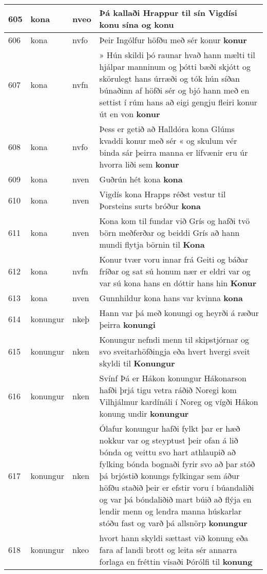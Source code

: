 \documentclass{article}
\begin{document}
\begin{longtable}{p{1cm}|p{1cm}|p{1cm}|p{13cm}}
\hline
605&kona&nveo&Þá kallaði Hrappur til sín Vigdísi konu sína og \textbf{konu} \\
\hline
606&kona&nvfo&Þeir Ingólfur höfðu með sér konur \textbf{konur} \\
\hline
607&kona&nvfn&» Hún skildi þó raunar hvað hann mælti til hjálpar manninum og þótti bæði skjótt og skörulegt hans úrræði og tók hún síðan búnaðinn af höfði sér og bjó hann með en settist í rúm hans að eigi gengju fleiri konur út en von \textbf{konur} \\
\hline
608&kona&nvfo&Þess er getið að Halldóra kona Glúms kvaddi konur með sér « og skulum vér binda sár þeirra manna er lífvænir eru úr hvorra liði sem \textbf{konur} \\
\hline
609&kona&nven&Guðrún hét kona \textbf{kona} \\
\hline
610&kona&nven&Vigdís kona Hrapps réðst vestur til Þorsteins surts bróður \textbf{kona} \\
\hline
611&kona&nven&Kona kom til fundar við Grís og hafði tvö börn meðferðar og beiddi Grís að hann mundi flytja börnin til \textbf{Kona} \\
\hline
612&kona&nvfn&Konur tvær voru innar frá Geiti og báðar fríðar og sat sú honum nær er eldri var og var sú kona hans en dóttir hans hin \textbf{Konur} \\
\hline
613&kona&nven&Gunnhildur kona hans var kvinna \textbf{kona} \\
\hline
614&konungur&nkeþ&Hann var þá með konungi og heyrði á ræður þeirra \textbf{konungi} \\
\hline
615&konungur&nken&Konungur nefndi menn til skipstjórnar og svo sveitarhöfðingja eða hvert hvergi sveit skyldi til \textbf{Konungur} \\
\hline
616&konungur&nken&Svínf Þá er Hákon konungur Hákonarson hafði þrjá tigu vetra ráðið Noregi kom Vilhjálmur kardínáli í Noreg og vígði Hákon konung undir \textbf{konungur} \\
\hline
617&konungur&nken&Ólafur konungur hafði fylkt þar er hæð nokkur var og steyptust þeir ofan á lið bónda og veittu svo hart athlaupið að fylking bónda bognaði fyrir svo að þar stóð þá brjóstið konungs fylkingar sem áður höfðu staðið þeir er efstir voru í búandaliði og var þá bóndaliðið mart búið að flýja en lendir menn og lendra manna húskarlar stóðu fast og varð þá allsnörp \textbf{konungur} \\
\hline
618&konungur&nkeo&hvort hann skyldi sættast við konung eða fara af landi brott og leita sér annarra forlaga en fréttin vísaði Þórólfi til \textbf{konung} \\

\end{longtable}
\end{document}
